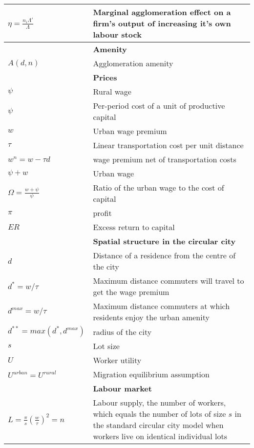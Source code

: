 \documentclass{standalone}
\begin{document}
\begin{longtable}{lp{10cm}}
$\eta=\frac{n_i\Lambda'}{\Lambda}$  &   Marginal agglomeration effect on a firm's output of increasing it's own labour stock\\
\hline
	&\textbf{Amenity}\\ \hline
$A(d, n)$   &  Agglomeration amenity\\
\hline

		& \textbf{Prices}\\ \hline
$\psi$  &  Rural wage\\
$\psi$  &  Per-period cost of a unit of productive capital\\
$w$     &  Urban wage premium\\
$\tau$  &  Linear transportation cost per unit distance\\
$w^n=w-\tau d$ & wage  premium net of transportation costs\\
$\psi + w$  &  Urban wage\\
$\Omega=\frac{w+\psi}{\psi}$  &  Ratio of the urban wage to the  cost of capital\\
$\pi$	 & profit\\
$ER$	& Excess return to capital\\
\hline
		&\textbf{Spatial structure in the circular city}\\ \hline		
$d$  &  Distance of a residence from the centre of the city\\
$d^* = w/\tau$  &  Maximum distance commuters will travel to get the wage premium\\
$d^{max} = w/\tau$  &  Maximum distance commuters at which residents enjoy the urban amenity\\
$d^{**} = max(d^*, d^{max})$  &  radius of the city\\
$s$ & Lot size\\
$U$  &  Worker utility\\%
$U^{urban}=U^{rural} $  &   Migration equilibrium assumption\\
\hline
		& \textbf{Labour market}\\ \hline
$L= \frac{\pi}{s}(\frac{w}{\tau})^2 = n$  &  
Labour supply, the number of workers, which equals the number of lots of size $s$ in the standard circular city model when workers live on identical individual lots\\%
\hline


\end{longtable}  
\end{document}
